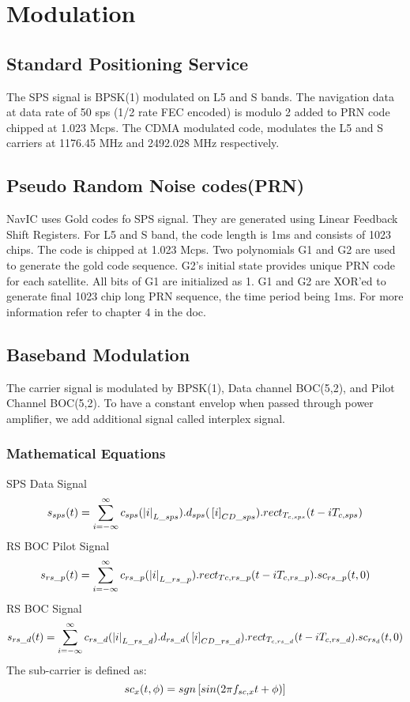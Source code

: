 \section{Modulation}
\subsection{Standard Positioning Service}
The SPS signal is BPSK(1) modulated on L5 and S bands. The navigation data at data rate of 50 sps (1/2 rate FEC encoded) is modulo 2 added to PRN code chipped at 1.023 Mcps. The CDMA modulated code, modulates the L5 and S carriers at 1176.45 MHz and 2492.028 MHz respectively.
\subsection{Pseudo Random Noise codes(PRN)}
NavIC uses Gold codes fo SPS signal. They are generated using Linear Feedback Shift Registers. For L5 and S band, the code length is 1ms and consists of 1023 chips. The code is chipped at 1.023 Mcps. Two polynomials G1 and G2 are used to generate the gold code sequence. G2's initial state provides unique PRN code for each satellite. All bits of G1 are initialized as 1. G1 and G2 are XOR'ed to generate final 1023 chip long PRN sequence, the time period being 1ms. For more information refer to chapter 4 in the doc.
\subsection{Baseband Modulation}
The carrier signal is modulated by BPSK(1), Data channel BOC(5,2), and Pilot Channel BOC(5,2). To have a constant envelop when passed through power amplifier, we add additional signal called interplex signal.
\subsubsection{Mathematical Equations}
SPS Data Signal
\begin{equation}
	s_{sps}(t) = \sum_{i=-\infty}^{\infty} c_{sps}(\left\vert i\right\vert_{L\_sps}) . d_{sps}({}\left[i\right]_{CD\_sps}) . rect_{T_{c,sps}}(t-iT_{c,sps})
\end{equation}
RS BOC Pilot Signal
\begin{equation}
	s_{rs\_p}(t) = \sum_{i=-\infty}^{\infty} c_{rs\_p}(\left\vert i\right\vert_{L\_rs\_p}) . rect_{Tc,rs\_p}(t-iT_{c,rs\_p}). sc_{rs\_p}(t,0)
\end{equation}
RS BOC Signal
\begin{equation}
	s_{rs\_d}(t) = \sum_{i=-\infty}^{\infty} c_{rs\_d}(\left\vert i\right\vert_{L\_rs\_d}) . d_{rs\_d}({}\left[i\right]_{CD\_rs\_d}). rect_{T_{c,rs\_d}}(t-iT_{c,rs\_d}). sc_{rs_d}(t,0)
\end{equation}
The sub-carrier is defined as:
\begin{equation}
	sc_x(t,\phi) = sgn{}\left[sin(2 \pi f_{sc,x}t + \phi)\right]
\end{equation}

